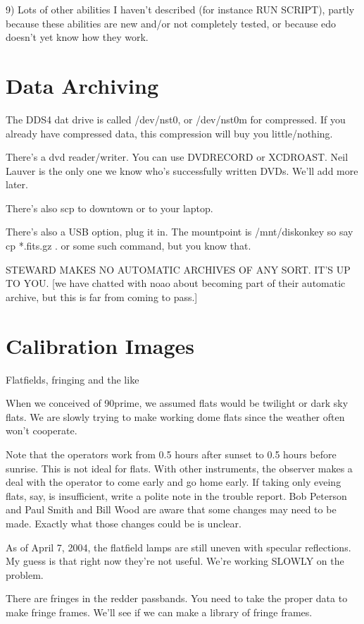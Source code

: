 \documentclass[letterpaper,12pt]{article}
\begin{document}
     9) Lots of other abilities I haven't described (for instance
        RUN SCRIPT), partly because these abilities are new
        and/or not completely tested, or because edo doesn't
        yet know how they work. 

\section{Data Archiving}

The DDS4 dat drive is called /dev/nst0, or /dev/nst0m for compressed.
If you already have compressed data, this compression will
buy you little/nothing. 

There's a dvd reader/writer. You can use DVDRECORD or XCDROAST.
Neil Lauver is the only one we know who's successfully written
DVDs. We'll add more later.

There's also scp to downtown or to your laptop.

There's also a USB option, plug it in. The mountpoint is
/mnt/diskonkey
so say cp *.fits.gz .
or some such command, but you know that.

STEWARD MAKES NO AUTOMATIC ARCHIVES OF ANY SORT. IT'S UP TO YOU.
[we have chatted with noao about becoming part of their
automatic archive, but this is far from coming to pass.]

\section{Calibration Images}

Flatfields, fringing and the like

When we conceived of 90prime, we assumed flats would be twilight
or dark sky flats. We are slowly trying to make working dome flats
since the weather often won't cooperate.

Note that the operators work from 0.5 hours after sunset to
0.5 hours before sunrise. This is not ideal for flats. 
With other instruments, the observer makes a deal with
the operator to come early and go home early. If taking only
eveing flats, say, is insufficient, write a polite note
in the trouble report. Bob Peterson and Paul Smith and
Bill Wood are aware that some changes may need to be made.
Exactly what those changes could be is unclear.

As of April 7, 2004, the flatfield lamps are still uneven
with specular reflections. My guess is that right now they're
not useful. We're working SLOWLY on the problem.

There are fringes in the redder passbands. You need to take
the proper data to make fringe frames. We'll see if we can
make a library of fringe frames.
\end{document}
